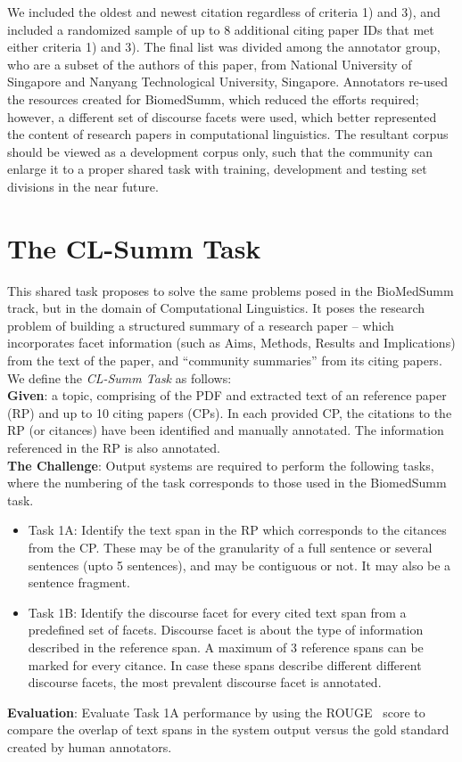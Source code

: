 \documentclass[11pt]{article}
\begin{document}
We included the oldest and newest citation regardless of criteria 1) and 3), and included a randomized sample of up to 8 additional citing paper IDs that met either criteria 1) and 3). The final list was divided among the annotator group, who are a subset of the authors of this paper, from National University of Singapore and Nanyang Technological University, Singapore. Annotators re-used the resources created for BiomedSumm, which reduced the efforts required; however, a different set of discourse facets were used, which better represented the content of research papers in computational linguistics. The resultant corpus should be viewed as a development corpus only, such that the community can enlarge it to a proper shared task with training, development and testing set divisions in the near future.


\section{The CL-Summ Task}
This shared task proposes to solve the same problems posed in the BioMedSumm track, but in the domain of Computational Linguistics. It poses the research problem of building a structured summary of a research paper -- which incorporates facet information (such as Aims, Methods, Results and Implications) from the text of the paper, and ``community summaries'' from its citing papers. \\

\noindent We define the {\it CL-Summ Task} as follows:\\
{\bf Given}: a topic, comprising of the PDF and extracted text of an reference paper (RP) and up to 10 citing papers (CPs).  In each provided CP, the citations to the RP (or citances) have been identified and manually annotated. The information referenced in the RP is also annotated.  \\
{\bf The Challenge}: Output systems are required to perform the following tasks, where the numbering of the task corresponds to those used in the BiomedSumm task.

\begin{itemize}
\item Task 1A: Identify the text span in the RP which corresponds to the citances from the CP. These may be of the granularity of a full   sentence or several sentences (upto 5 sentences), and may be contiguous or not. It may also be a sentence fragment.
\vspace{-.3cm}
\item Task 1B: Identify the discourse facet for every cited text span from a predefined set of facets. Discourse facet is about the type of information described in the reference span. A maximum of 3 reference spans can be marked for 
every citance. In case these spans describe different different discourse facets, the most prevalent discourse facet is annotated.
\end{itemize}
{\bf Evaluation}: Evaluate Task 1A performance by using the ROUGE~\cite{Lin:2004} score to compare the overlap of text spans in
the system output versus the gold standard created by human annotators.
\end{document}
